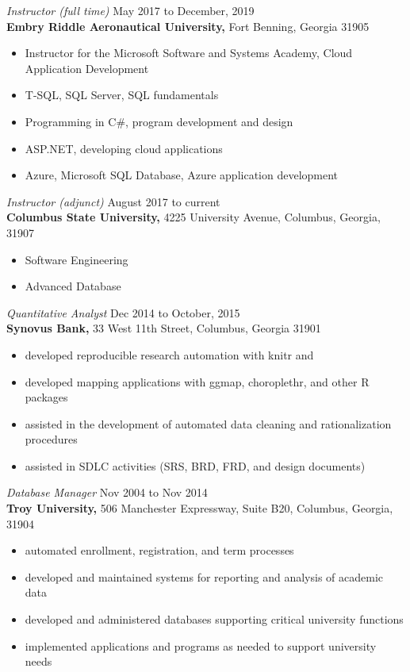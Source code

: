 \documentclass[margin, 10pt]{res} %
\begin{document}
\begin{resume}
{\it Instructor (full time)} \hfill May 2017 to December, 2019 \\
\textbf{Embry Riddle Aeronautical University,} Fort Benning, Georgia 31905

\begin{itemize} \itemsep -2pt %
\item Instructor for the Microsoft Software and Systems Academy, Cloud Application Development
\item T-SQL, SQL Server, SQL fundamentals
\item Programming in C\#, program development and design
\item ASP.NET, developing cloud applications
\item Azure, Microsoft SQL Database, Azure application development
\end{itemize}
 
{\it Instructor (adjunct)} \hfill August 2017 to current \\
\textbf{Columbus State University,} 4225 University Avenue, Columbus, Georgia, 31907

\begin{itemize} \itemsep -2pt %
\item Software Engineering
\item Advanced Database
\end{itemize}

{\it Quantitative Analyst} \hfill Dec 2014 to October, 2015 \\
\textbf{Synovus Bank,} 33 West 11th Street, Columbus, Georgia 31901

\begin{itemize} \itemsep -2pt %
\item developed reproducible research automation with knitr and \LaTeXe
\item developed mapping applications with ggmap, choroplethr, and other \textsf{R} packages
\item assisted in the development of automated data cleaning and rationalization procedures
\item assisted in SDLC activities (SRS, BRD, FRD, and design documents)
\end{itemize}
 
{\it Database Manager} \hfill Nov 2004 to Nov 2014 \\
\textbf{Troy University,} 506 Manchester Expressway, Suite B20, Columbus, Georgia, 31904

\begin{itemize} \itemsep -2pt %
\item automated enrollment, registration, and term processes
\item developed and maintained systems for reporting and analysis of academic data
\item developed and administered databases supporting critical university functions 
\item implemented applications and programs as needed to support university needs 
\end{itemize}
 

\end{resume}
\end{document}
